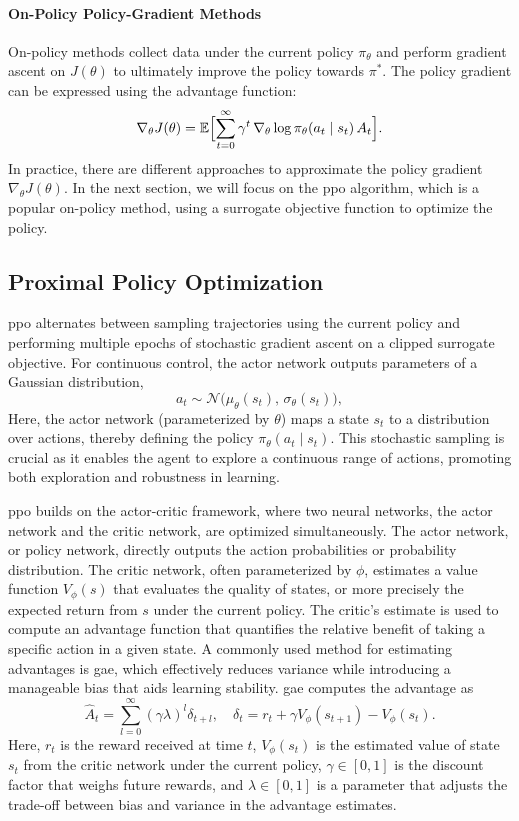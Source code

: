 \paragraph{On-Policy Policy-Gradient Methods}
On-policy methods collect data under the current policy \(\pi_\theta\) and perform gradient ascent on \(J(\theta)\) to ultimately improve the policy towards \(\pi^*\). The policy gradient can be expressed using the advantage function:
\[
\nabla_\theta J(\theta)
= \mathbb{E}\Bigl[\sum_{t=0}^\infty \gamma^t\,\nabla_\theta \log \pi_\theta(a_t\mid s_t)\,A_t\Bigr].
\]
In practice, there are different approaches to approximate the policy gradient \(\nabla_{\theta}J(\theta)\). In the next section, we will focus on the \gls{ppo} algorithm, which is a popular on-policy method, using a surrogate objective function to optimize the policy.
\subsection{Proximal Policy Optimization}
\gls{ppo} \cite{schulman2017proximal} alternates between sampling trajectories using the current policy and performing multiple epochs of stochastic gradient ascent on a clipped surrogate objective. For continuous control, the actor network outputs parameters of a Gaussian distribution,
\[
a_t \sim \mathcal{N}\bigl(\mu_\theta(s_t),\,\sigma_\theta(s_t)\bigr),
\]
Here, the actor network (parameterized by \(\theta\)) maps a state \(s_t\) to a distribution over actions, thereby defining the policy \(\pi_\theta(a_t \mid s_t)\). This stochastic sampling is crucial as it enables the agent to explore a continuous range of actions, promoting both exploration and robustness in learning.

\gls{ppo} builds on the actor-critic framework, where two neural networks, the actor network and the critic network, are optimized simultaneously. The actor network, or policy network, directly outputs the action probabilities or probability distribution. The critic network, often parameterized by \(\phi\), estimates a value function \(V_\phi(s)\) that evaluates the quality of states, or more precisely the expected return from \(s\) under the current policy. The critic's estimate is used to compute an advantage function that quantifies the relative benefit of taking a specific action in a given state. A commonly used method for estimating advantages is \gls{gae}, which effectively reduces variance while introducing a manageable bias that aids learning stability. \gls{gae} computes the advantage as
\[
\hat{A}_t = \sum_{l=0}^{\infty} (\gamma \lambda)^l \delta_{t+l}, 
\quad
\delta_t = r_t + \gamma V_\phi(s_{t+1}) - V_\phi(s_t).
\]
Here, \(r_t\) is the reward received at time \(t\), \(V_\phi(s_t)\) is the estimated value of state \(s_t\) from the critic network under the current policy, \(\gamma \in [0,1]\) is the discount factor that weighs future rewards, and \(\lambda \in [0,1]\) is a parameter that adjusts the trade-off between bias and variance in the advantage estimates.

